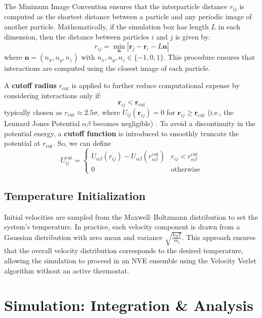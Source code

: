 \documentclass{article}
\begin{document}
The Minimum Image Convention ensures that the interparticle distance \(r_{ij}\) is computed as the shortest distance between a particle and any periodic image of another particle. Mathematically, if the simulation box has length \(L\) in each dimension, then the distance between particles \(i\) and \(j\) is given by:
\begin{equation}
    r_{ij} = \min_{\mathbf{n}} |\mathbf{r}_j - \mathbf{r}_i - L\mathbf{n}|
\end{equation}
where \(\mathbf{n} = (n_x, n_y, n_z)\) with \( n_x, n_y, n_z \in \{-1,0,1\}\). This procedure ensures that interactions are computed using the closest image of each particle.

A \textbf{cutoff radius} \(r_{\text{cut}}\) is applied to further reduce computational expense by considering interactions only if:
\[
\textbf{r}_{ij} < \textbf{r}_{\text{cut}}
\]
typically chosen as \(r_{\text{cut}} \approx 2.5\sigma\), where \(U_{ij}(\textbf{r}_{ij})=0\) 
for \(\textbf{r}_{ij}\geq \textbf{r}_{\text{cut}}\) (i.e., the Lennard Jones Potential \(\alpha\beta\) becomes negligible) \cite{vollmayr2020introduction,kob1994scaling}. 
To avoid a discontinuity in the potential energy, a \textbf{cutoff function} is introduced to smoothly truncate the potential at \(r_{\text{cut}}\).
So, we can define 
\begin{equation}
    U_{ij}^{\text{cut}} = 
    \begin{cases}
        U_{\alpha\beta}(r_{ij}) - U_{\alpha\beta}(r_{\alpha\beta}^{\text{cut}}) & r_{ij} < r_{\alpha\beta}^\text{cut} \\
        0 & \text{otherwise}
    \end{cases}
\end{equation}

\subsection{Temperature Initialization}
Initial velocities are sampled from the Maxwell--Boltzmann distribution to set 
the system’s temperature. In practice, each velocity component is drawn from a 
Gaussian distribution with zero mean and variance \(\sqrt{\frac{k_B T}{m_i}}\). 
This approach ensures that the overall velocity distribution corresponds to the 
desired temperature, allowing the simulation to proceed in an NVE ensemble using 
the Velocity Verlet algorithm without an active thermostat.

\section{Simulation: Integration \& Analysis}
\end{document}
